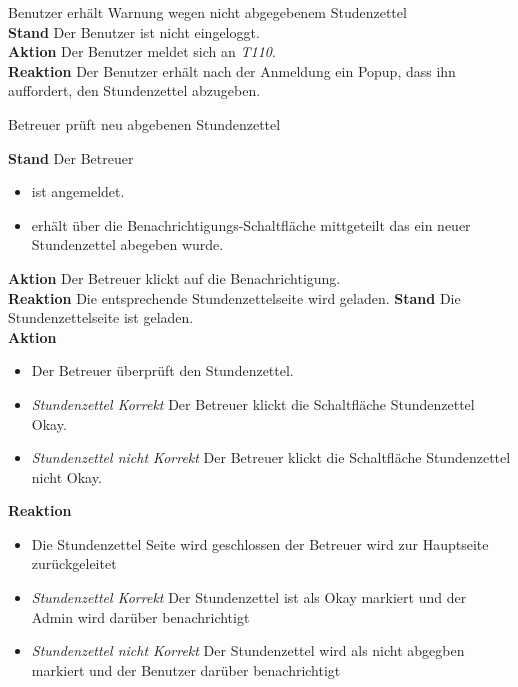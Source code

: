 \begin{requirements}
	 Benutzer erhält Warnung wegen nicht abgegebenem Studenzettel \\
        \textbf{Stand} Der Benutzer ist nicht eingeloggt. \\
        \textbf{Aktion} Der Benutzer meldet sich an \textit{T110}. \\
        \textbf{Reaktion} Der Benutzer erhält nach der Anmeldung ein Popup, dass ihn auffordert, den Stundenzettel abzugeben.

	 Betreuer prüft neu abgebenen Stundenzettel
	\begin{requirements}
	        \textbf{Stand} Der Betreuer
	            \begin{itemize}
	                \item ist angemeldet.
	                \item erhält über die Benachrichtigungs-Schaltfläche mittgeteilt das ein neuer Stundenzettel abegeben wurde.
	            \end{itemize}
            \textbf{Aktion} Der Betreuer klickt auf die Benachrichtigung. \\
            \textbf{Reaktion} Die entsprechende Stundenzettelseite wird  geladen.
	        \textbf{Stand} Die Stundenzettelseite ist geladen. \\
            \textbf{Aktion}
                \begin{itemize}
                    \item Der Betreuer überprüft den Stundenzettel.
                    \item \textit{Stundenzettel Korrekt} Der Betreuer klickt die Schaltfläche Stundenzettel Okay.
                    \item \textit{Stundenzettel nicht Korrekt}  Der Betreuer klickt die Schaltfläche Stundenzettel nicht Okay.
                \end{itemize}
            \textbf{Reaktion}
                \begin{itemize}
                    \item Die Stundenzettel Seite wird geschlossen der Betreuer wird zur Hauptseite zurückgeleitet
                    \item \textit{Stundenzettel Korrekt} Der Stundenzettel ist als Okay markiert und der Admin wird darüber benachrichtigt
                    \item \textit{Stundenzettel nicht Korrekt} Der Stundenzettel wird als nicht abgegben markiert und der Benutzer darüber benachrichtigt
                \end{itemize}
	\end{requirements}


\end{requirements}
